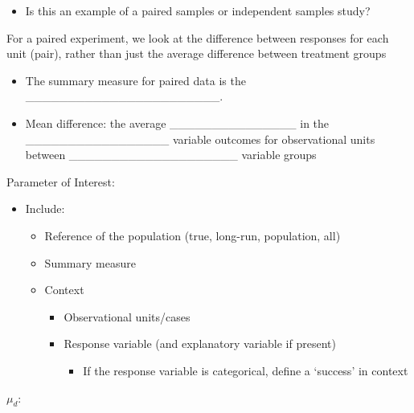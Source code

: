 \documentclass[
]{report}
\providecommand{\tightlist}{%
  \setlength{\itemsep}{0pt}\setlength{\parskip}{0pt}}
\begin{document}
\begin{itemize}
\tightlist
\item
  Is this an example of a paired samples or independent samples study?
\end{itemize}

\vspace{0.3in}

For a paired experiment, we look at the difference between responses for each unit (pair), rather than just the average difference between treatment groups


\begin{itemize}
\item
  The summary measure for paired data is the \_\_\_\_\_\_\_\_\_\_\_\_\_\_\_\_\_\_\_\_\_\_\_.
\item
  Mean difference: the average \_\_\_\_\_\_\_\_\_\_\_\_\_\_\_ in the \_\_\_\_\_\_\_\_\_\_\_\_\_\_\_\_\_
  variable outcomes for observational units between \_\_\_\_\_\_\_\_\_\_\_\_\_\_\_\_\_\_\_\_ variable groups
\end{itemize}


Parameter of Interest:

\begin{itemize}
\item
  Include:

  \begin{itemize}
  \item
    Reference of the population (true, long-run, population, all)
  \item
    Summary measure
  \item
    Context

    \begin{itemize}
    \item
      Observational units/cases
    \item
      Response variable (and explanatory variable if present)

      \begin{itemize}
      \tightlist
      \item
        If the response variable is categorical, define a `success' in context
      \end{itemize}
    \end{itemize}
  \end{itemize}
\end{itemize}

\(\mu_d:\)
\end{document}
